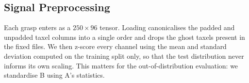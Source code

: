 \documentclass[journal]{IEEEtran}
\begin{document}




%
\subsection{Signal Preprocessing}
\label{Methodology:Signal_Preprocessing}
%
Each grasp enters as a $250 \times 96$ tensor. Loading canonicalises the padded and unpadded taxel columns into a single order and drops the ghost taxels present in the fixed files. We then z-score every channel using the mean and standard deviation computed on the training split only, so that the test distribution never informs its own scaling. This matters for the out-of-distribution evaluation: we standardise B using A's statistics.
%
\end{document}
